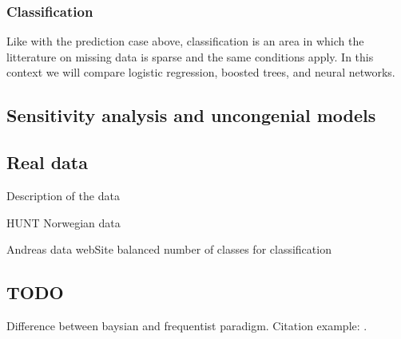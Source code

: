 \documentclass{article}
\begin{document}
	
	
	
	\subsubsection{Classification}
	Like with the prediction case above, classification is an area in which the litterature on missing data is sparse and the same conditions apply. In this context we will compare logistic regression, boosted trees, and neural networks.
	
	
	\subsection{Sensitivity analysis and uncongenial models}
	
	\subsection{Real data}
	
	Description of the data
	
	HUNT Norwegian data
	
	Andreas data webSite
	balanced number of classes for classification
	
	
	\subsection{TODO}
	Difference between baysian and frequentist paradigm.
	Citation example:
	\cite[P.10]{grund_pooling_2016}.

		
	
	
\end{document}
